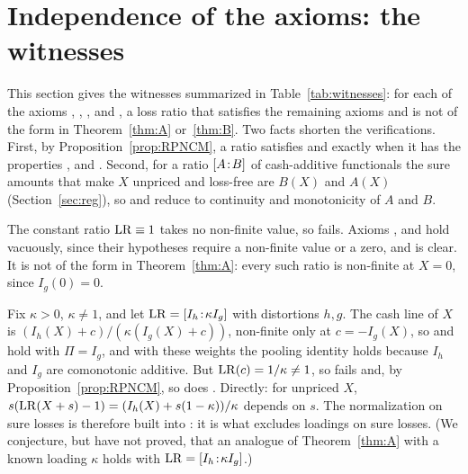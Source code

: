 \section{Independence of the axioms: the witnesses}\label{supp:witnesses}

This section gives the witnesses summarized in Table~\ref{tab:witnesses}: for each of the axioms \axPe, \axR,
\axLI, \axRC{} and \axRM, a loss ratio that satisfies the remaining axioms and is not of the form in
Theorem~\ref{thm:A} or~\ref{thm:B}. Two facts shorten the verifications.
First, by Proposition~\ref{prop:RPNCM}, a ratio satisfies \axPe{} and \axR{} exactly when it has the properties
\axP, \axN{} and \axCM. Second, for a ratio $[A\!:\!B]$ of cash-additive functionals the sure amounts that
make $X$ unpriced and loss-free are $B(X)$ and $A(X)$ (Section~\ref{sec:reg}), so \axRC{} and \axRM{} reduce to
continuity and monotonicity of $A$ and $B$.

\begin{example}
The constant ratio $\mathrm{LR}\equiv1$ takes no non-finite value, so \axPe{} fails. Axioms \axR, \axRC{} and \axRM{} hold
vacuously, since their hypotheses require a non-finite value or a zero, and \axLI{} is clear. It is not of the form
in Theorem~\ref{thm:A}: every such ratio is non-finite at $X=0$, since $I_g(0)=0$.
\end{example}

\begin{example}
Fix $\kappa>0$, $\kappa\neq1$, and let $\mathrm{LR}=[I_h\!:\!\kappa I_g]$ with distortions $h,g$. The cash line of
$X$ is $(I_h(X)+c)/(\kappa(I_g(X)+c))$, non-finite only at $c=-I_g(X)$, so \axPe{} and \axP{} hold with $\Pi=I_g$,
and with these weights the pooling identity \axCM{} holds because $I_h$ and $I_g$ are comonotonic additive. But
$\mathrm{LR}(c)=1/\kappa\ne1$, so \axN{} fails and, by Proposition~\ref{prop:RPNCM}, so does \axR. Directly: for unpriced
$X$, $s(\mathrm{LR}(X+s)-1)=(I_h(X)+s(1-\kappa))/\kappa$ depends on $s$. The normalization on sure losses is therefore built
into \axR: it is what excludes loadings on sure losses. (We conjecture, but have not proved, that an analogue of
Theorem~\ref{thm:A} with a known loading $\kappa$ holds with $\mathrm{LR}=[I_h\!:\!\kappa I_g]$.)
\end{example}

